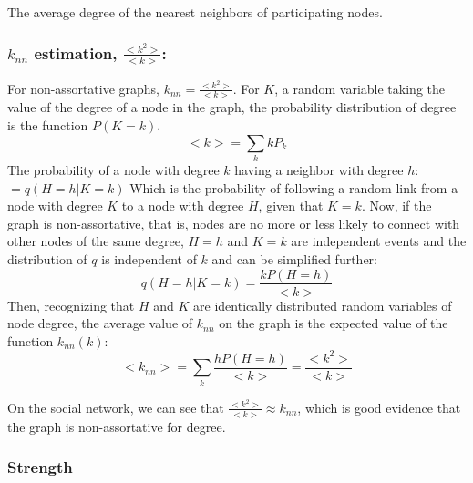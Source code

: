 \documentclass[12pt]{article}
\begin{document}
The average degree of the nearest neighbors of participating nodes. 

\subsubsection*{\(k_{nn}\) estimation, \(\frac{<k^2>}{<k>}\):}

For non-assortative graphs, \(k_{nn} = \frac{<k^2>}{<k>}\).
For \(K\), a random variable taking the value of the degree of a node in the graph, the probability distribution of degree is the function \(P(K = k)\).
\[<k> = \sum_k kP_k\]
The probability of a node with degree \(k\) having a neighbor with degree \(h\): \( = q(H = h | K = k)\)
Which is the probability of following a random link from a node with degree \(K\) to a node with degree \(H\), given that \(K = k\). Now, if  the graph is non-assortative, that is, nodes are no more or less likely to connect with other nodes of the same degree, \(H = h\) and \(K = k\) are independent events and the distribution of \(q\) is independent of \(k\) and can be simplified further:
\[ q(H = h | K = k) = \frac{ k P(H = h)}{<k>}\]
Then, recognizing that \(H\) and \(K\) are identically distributed random variables of node degree, the average value of \(k_{nn}\) on the graph is the expected value of the function \(k_{nn}(k)\):
\[<k_{nn}> = \sum_{k} \frac{ h P(H = h)}{<k>} =  \frac{<k^2>}{<k>}  \]

On the social network, we can see that \(\frac{<k^2>}{<k>} \approx k_{nn}\), which is good evidence that the graph is non-assortative for degree.

\subsubsection*{Strength}
\end{document}

